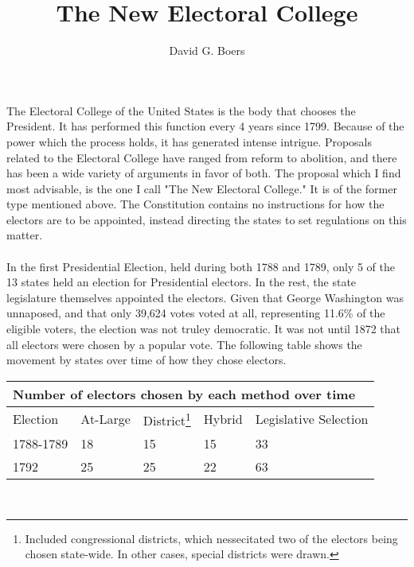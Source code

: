 \documentclass{article}
\title{The New Electoral College}
\author{David G. Boers}
\begin{document}
    \maketitle
    The Electoral College of the United States is the body that chooses the President. It has performed this function every 4 years since 1799. Because of the power which the process holds, it has generated intense intrigue. Proposals related to the Electoral College have ranged from reform to abolition, and there has been a wide variety of arguments in favor of both. The proposal which I find most advisable, is the one I call "The New Electoral College." It is of the former type mentioned above.
    The Constitution contains no instructions for how the electors are to be appointed, instead directing the states to set regulations on this matter.\\

    \\

    In the first Presidential Election, held during both 1788 and 1789, only 5 of the 13 states held an election for Presidential electors. In the rest, the state legislature themselves appointed the electors. Given that George Washington was unnaposed, and that only 39,624 votes voted at all, representing 11.6\% of the eligible voters, the election was not truley democratic. It was not until 1872 that all electors were chosen by a popular vote. The following table shows the movement by states over time of how they chose electors.\\
    \begin{adjustbox}{center}
    \begin{tabular}{ |l|l|l|l|l| }
        \multicolumn{5}{|l|}{Number of electors chosen by each method over time} \\
        \hline
        Election & At-Large & District\footnote{Included congressional districts, which nessecitated two of the electors being chosen state-wide. In other cases, special districts were drawn.} & Hybrid & Legislative Selection \\
        \hline
        1788-1789 & 18 & 15 & 15 & 33 \\
        1792 & 25 & 25 & 22 & 63
    \end{tabular}
    \end{adjustbox} \\
\end{document}

